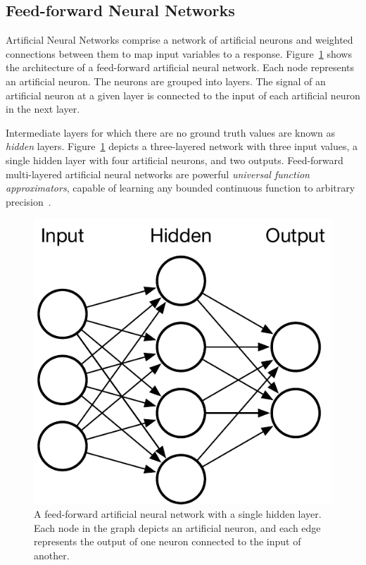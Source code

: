 



\subsection{Feed-forward Neural Networks}

Artificial Neural Networks comprise a network of artificial neurons and weighted connections between them to map input variables to a response. Figure~\ref{fig:artificial-neural-network} shows the architecture of a feed-forward artificial neural network. Each node represents an artificial neuron. The neurons are grouped into layers. The signal of an artificial neuron at a given layer is connected to the input of each artificial neuron in the next layer.

Intermediate layers for which there are no ground truth values are known as \emph{hidden} layers. Figure~\ref{fig:artificial-neural-network} depicts a three-layered network with three input values, a single hidden layer with four artificial neurons, and two outputs. Feed-forward multi-layered artificial neural networks are powerful \emph{universal function approximators}, capable of learning any bounded continuous function to arbitrary precision~\cite{Hornik1991,Lu2017,Yarotsky2017}.

\begin{figure}
  \centering
  \includegraphics[width=.45\columnwidth]{img/artificial-neural-network}%
  \caption[Structure of an artificial neural network]{%
    A feed-forward artificial neural network with a single hidden layer. Each node in the graph depicts an artificial neuron, and each edge represents the output of one neuron connected to the input of another.%
  }%
  \label{fig:artificial-neural-network}
\end{figure}

